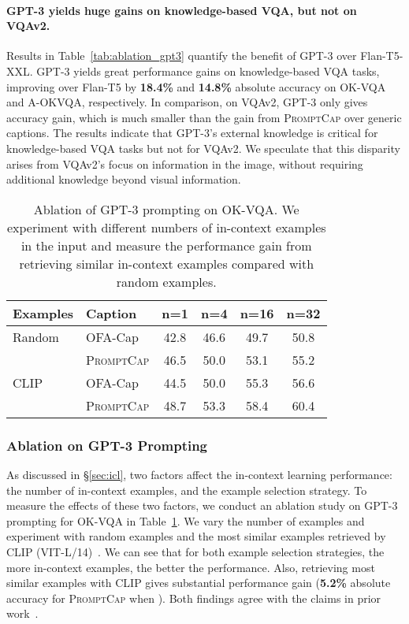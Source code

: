\documentclass[10pt,twocolumn,letterpaper]{article}
\newcommand{\NAME}{\textsc{PromptCap}\xspace}
\begin{document}
\paragraph{GPT-3 yields huge gains on knowledge-based VQA, but not on VQAv2.} Results in Table~\ref{tab:ablation_gpt3} quantify the benefit of GPT-3 over Flan-T5-XXL. GPT-3 yields great performance gains on knowledge-based VQA tasks, improving over Flan-T5 by \textbf{18.4\%} and \textbf{14.8\%} absolute accuracy on OK-VQA and A-OKVQA, respectively. In comparison, on VQAv2, GPT-3 only gives \textbf{} accuracy gain, which is much smaller than the gain from \NAME over generic captions. The results indicate that GPT-3's external knowledge is critical for knowledge-based VQA tasks but not for VQAv2. We speculate that this disparity arises from VQAv2's focus on information in the image, without requiring additional knowledge beyond visual information.

\begin{table}[h]
\small
\centering
\caption{
Ablation of GPT-3 prompting on OK-VQA. We experiment with different numbers of in-context examples in the input and measure the performance gain from retrieving similar in-context examples compared with random examples.
}
\begin{tabular}{l|l|cccc}
\toprule[1.2pt]
Examples & Caption & n=1 & n=4 & n=16 & n=32\\
\midrule
Random & OFA-Cap & 42.8 & 46.6 & 49.7 & 50.8\\
&\NAME & 46.5 & 50.0 & 53.1 & 55.2\\
\midrule
CLIP & OFA-Cap & 44.5 & 50.0 & 55.3 & 56.6\\
&\NAME & 48.7 & 53.3 & 58.4 & 60.4\\
\bottomrule[1.2pt]
\end{tabular}
\label{tab:prompt_ablation}
\end{table} 
\vspace{-0.1in}
\subsubsection{Ablation on GPT-3 Prompting}
As discussed in \S\ref{sec:icl}, two factors affect the in-context learning performance: the number of in-context examples, and the example selection strategy. To measure the effects of these two factors, we conduct an ablation study on GPT-3 prompting for OK-VQA in Table~\ref{tab:prompt_ablation}. We vary the number of examples  and experiment with random examples and the most similar examples retrieved by CLIP (VIT-L/14)~\cite{radford2021learning}. We can see that for both example selection strategies, the more in-context examples, the better the performance. Also, retrieving most similar examples with CLIP gives substantial performance gain (\textbf{5.2\%} absolute accuracy for \NAME when ). Both findings agree with the claims in prior work~\cite{brown2020language, liu-etal-2022-makes, yang2022empirical}.
\end{document}
